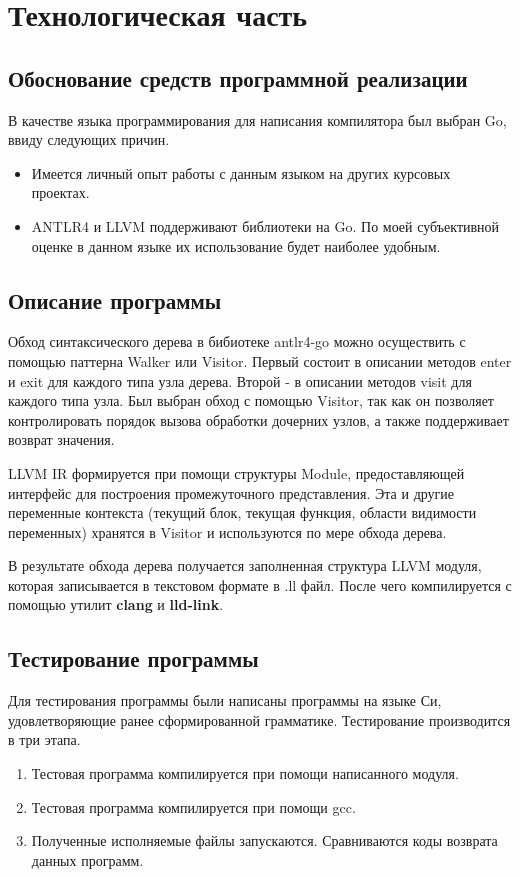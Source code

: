\section{Технологическая часть}

\subsection{Обоснование средств программной реализации}
В качестве языка программирования для написания компилятора был выбран Go\cite{golang}, ввиду следующих причин.
\begin{itemize}
    \item Имеется личный опыт работы с данным языком на других курсовых проектах.
    \item ANTLR4\cite{golang:antlr4} и LLVM\cite{golang:llvm} поддерживают библиотеки на Go. По моей субъективной оценке в данном языке их использование будет наиболее удобным.
\end{itemize}

\subsection{Описание программы}
Обход синтаксического дерева в бибиотеке antlr4-go можно осуществить с помощью паттерна Walker или Visitor. Первый состоит в описании методов enter и exit для каждого типа узла дерева. Второй - в описании методов visit для каждого типа узла. Был выбран обход с помощью Visitor, так как он позволяет контролировать порядок вызова обработки дочерних узлов, а также поддерживает возврат значения.

LLVM IR формируется при помощи структуры Module, предоставляющей интерфейс для построения промежуточного представления. Эта и другие переменные контекста (текущий блок, текущая функция, области видимости переменных) хранятся в Visitor и используются по мере обхода дерева.

В результате обхода дерева получается заполненная структура LLVM модуля, которая записывается в текстовом формате в .ll файл. После чего компилируется с помощью утилит \textbf{clang} и \textbf{lld-link}.

\subsection{Тестирование программы}
Для тестирования программы были написаны программы на языке Си, удовлетворяющие ранее сформированной грамматике. Тестирование производится в три этапа.
\begin{enumerate}
    \item Тестовая программа компилируется при помощи написанного модуля.
    \item Тестовая программа компилируется при помощи gcc.
    \item Полученные исполняемые файлы запускаются. Сравниваются коды возврата данных программ.
\end{enumerate}

